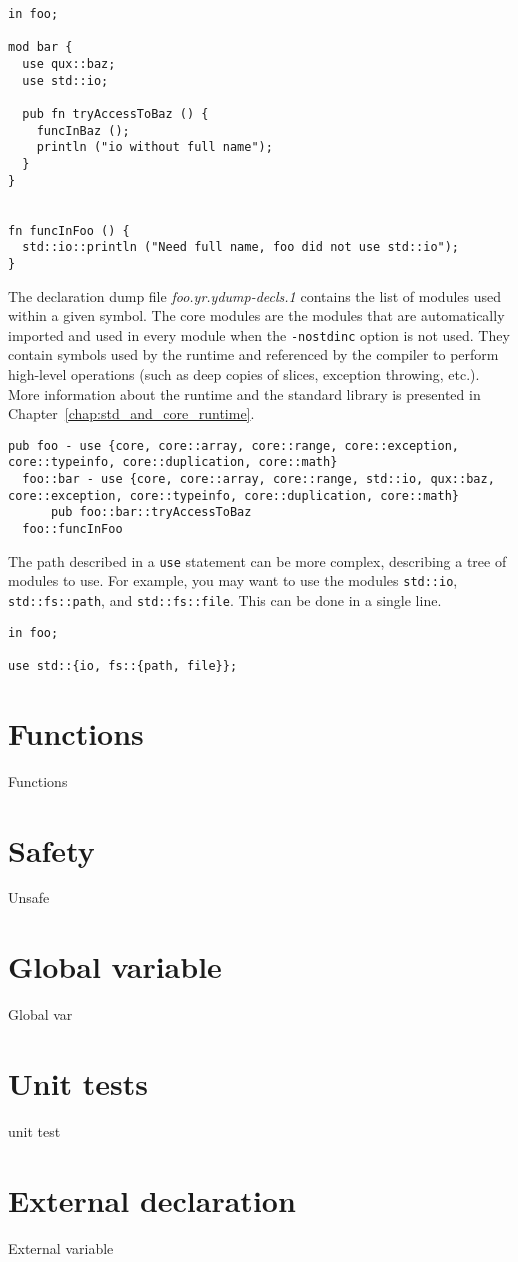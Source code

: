 \begin{lstlisting}[style=coloredverbatim]
in foo;

mod bar {
  use qux::baz;
  use std::io;

  pub fn tryAccessToBaz () {
    funcInBaz ();
    println ("io without full name");
  }
}


fn funcInFoo () {
  std::io::println ("Need full name, foo did not use std::io");
}
\end{lstlisting}

The declaration dump file \textit{foo.yr.ydump-decls.1} contains the list of
modules used within a given symbol. The core modules are the modules that are
automatically imported and used in every module when the \texttt{-nostdinc}
option is not used. They contain symbols used by the runtime and referenced by
the compiler to perform high-level operations (such as deep copies of slices,
exception throwing, etc.). More information about the runtime and the standard
library is presented in Chapter~\ref{chap:std_and_core_runtime}.

\begin{lstlisting}[style=intermediateVerb]
pub foo - use {core, core::array, core::range, core::exception, core::typeinfo, core::duplication, core::math}
  foo::bar - use {core, core::array, core::range, std::io, qux::baz, core::exception, core::typeinfo, core::duplication, core::math}
      pub foo::bar::tryAccessToBaz
  foo::funcInFoo
\end{lstlisting}

The path described in a \texttt{use} statement can be more complex, describing a
tree of modules to use. For example, you may want to use the modules
\texttt{std::io}, \texttt{std::fs::path}, and \texttt{std::fs::file}. This can
be done in a single line.

\begin{lstlisting}[style=coloredverbatim]
in foo;

use std::{io, fs::{path, file}};
\end{lstlisting}


\section{Functions}%
\label{sec:functions}

Functions

\section{Safety}%
\label{sec:unsafe}

Unsafe

\section{Global variable}%
\label{sec:global_variables}

Global var

\section{Unit tests}%
\label{sec:unit_test}

unit test

\section{External declaration}%
\label{sec:extern_var}

External variable
